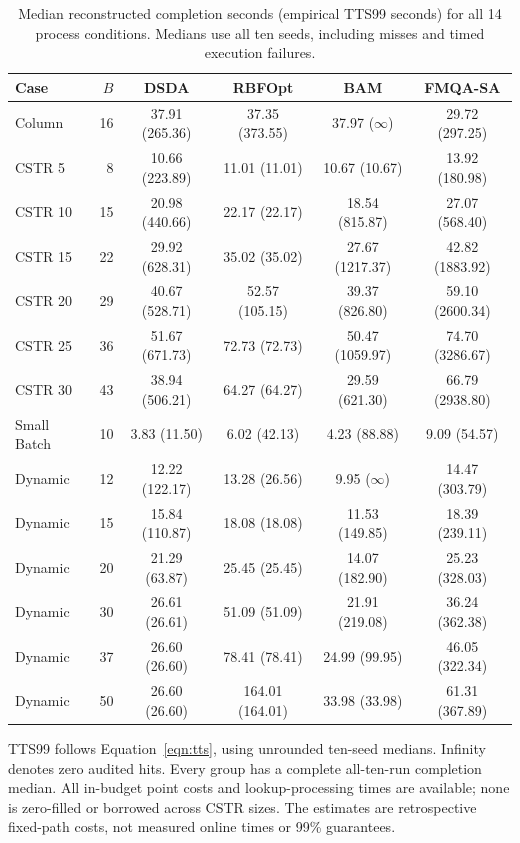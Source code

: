 \documentclass{article}
\begin{document}
\begin{table}[htbp]
\centering
\caption{Median reconstructed completion seconds (empirical TTS99 seconds) for all 14 process conditions. Medians use all ten seeds, including misses and timed execution failures.}
\label{tab:process-tts99}
\small
\setlength{\tabcolsep}{3pt}
\begin{tabular}{@{}lrcccc@{}}
\toprule
Case & $B$ & DSDA & RBFOpt & BAM & FMQA-SA \\
\midrule
Column & 16 & 37.91 (265.36) & 37.35 (373.55) & 37.97 (\(\infty\)) & 29.72 (297.25) \\
CSTR 5 & 8 & 10.66 (223.89) & 11.01 (11.01) & 10.67 (10.67) & 13.92 (180.98) \\
CSTR 10 & 15 & 20.98 (440.66) & 22.17 (22.17) & 18.54 (815.87) & 27.07 (568.40) \\
CSTR 15 & 22 & 29.92 (628.31) & 35.02 (35.02) & 27.67 (1217.37) & 42.82 (1883.92) \\
CSTR 20 & 29 & 40.67 (528.71) & 52.57 (105.15) & 39.37 (826.80) & 59.10 (2600.34) \\
CSTR 25 & 36 & 51.67 (671.73) & 72.73 (72.73) & 50.47 (1059.97) & 74.70 (3286.67) \\
CSTR 30 & 43 & 38.94 (506.21) & 64.27 (64.27) & 29.59 (621.30) & 66.79 (2938.80) \\
Small Batch & 10 & 3.83 (11.50) & 6.02 (42.13) & 4.23 (88.88) & 9.09 (54.57) \\
Dynamic & 12 & 12.22 (122.17) & 13.28 (26.56) & 9.95 (\(\infty\)) & 14.47 (303.79) \\
Dynamic & 15 & 15.84 (110.87) & 18.08 (18.08) & 11.53 (149.85) & 18.39 (239.11) \\
Dynamic & 20 & 21.29 (63.87) & 25.45 (25.45) & 14.07 (182.90) & 25.23 (328.03) \\
Dynamic & 30 & 26.61 (26.61) & 51.09 (51.09) & 21.91 (219.08) & 36.24 (362.38) \\
Dynamic & 37 & 26.60 (26.60) & 78.41 (78.41) & 24.99 (99.95) & 46.05 (322.34) \\
Dynamic & 50 & 26.60 (26.60) & 164.01 (164.01) & 33.98 (33.98) & 61.31 (367.89) \\
\bottomrule
\end{tabular}
\par\vspace{3pt}
\begin{minipage}{0.96\linewidth}
\footnotesize TTS99 follows Equation~\eqref{eqn:tts}, using unrounded ten-seed medians. Infinity denotes zero audited hits. Every group has a complete all-ten-run completion median. All in-budget point costs and lookup-processing times are available; none is zero-filled or borrowed across CSTR sizes. The estimates are retrospective fixed-path costs, not measured online times or 99\% guarantees.
\end{minipage}
\end{table}
\end{document}
